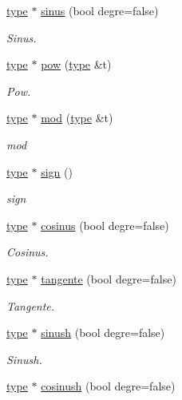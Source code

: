 \begin{DoxyCompactItemize}
\hyperlink{classtype}{type} $\ast$ \hyperlink{classentier_a5dd86ffdc48bf745871ac2f65199d2ce}{sinus} (bool degre=false)
\begin{DoxyCompactList}\small\item\em Sinus. \end{DoxyCompactList}\item 
\hyperlink{classtype}{type} $\ast$ \hyperlink{classentier_adc71e10e6ea385f7c1aa1de06e2d1b4c}{pow} (\hyperlink{classtype}{type} \&t)
\begin{DoxyCompactList}\small\item\em Pow. \end{DoxyCompactList}\item 
\hyperlink{classtype}{type} $\ast$ \hyperlink{classentier_a4e5c25c0ed52135136bb75563a9337e7}{mod} (\hyperlink{classtype}{type} \&t)
\begin{DoxyCompactList}\small\item\em mod \end{DoxyCompactList}\item 
\hyperlink{classtype}{type} $\ast$ \hyperlink{classentier_a4a25b08f29eba0a531bebadeaf77ee04}{sign} ()
\begin{DoxyCompactList}\small\item\em sign \end{DoxyCompactList}\item 
\hyperlink{classtype}{type} $\ast$ \hyperlink{classentier_a1313e6cfa480cab69942f9b97418e491}{cosinus} (bool degre=false)
\begin{DoxyCompactList}\small\item\em Cosinus. \end{DoxyCompactList}\item 
\hyperlink{classtype}{type} $\ast$ \hyperlink{classentier_a600a48ecf8280f0ab465ab3f3c253662}{tangente} (bool degre=false)
\begin{DoxyCompactList}\small\item\em Tangente. \end{DoxyCompactList}\item 
\hyperlink{classtype}{type} $\ast$ \hyperlink{classentier_abfb8840f088a4771520fd48a78c01434}{sinush} (bool degre=false)
\begin{DoxyCompactList}\small\item\em Sinush. \end{DoxyCompactList}\item 
\hyperlink{classtype}{type} $\ast$ \hyperlink{classentier_af111db8d7c89d47f20c59e3bd0ef1dfd}{cosinush} (bool degre=false)

\end{DoxyCompactItemize}
